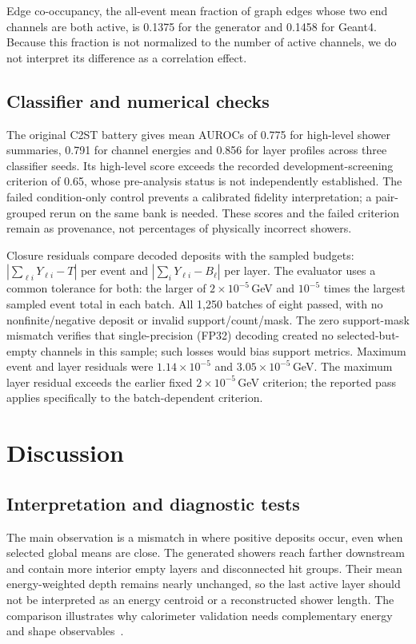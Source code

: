 \documentclass[10pt]{article}
\begin{document}
Edge co-occupancy, the all-event mean fraction of graph edges whose two end channels are both active, is 0.1375 for the generator and 0.1458 for Geant4. Because this fraction is not normalized to the number of active channels, we do not interpret its difference as a correlation effect.

\subsection{Classifier and numerical checks}

The original C2ST battery gives mean AUROCs of 0.775 for high-level shower summaries, 0.791 for channel energies and 0.856 for layer profiles across three classifier seeds. Its high-level score exceeds the recorded development-screening criterion of 0.65, whose pre-analysis status is not independently established. The failed condition-only control prevents a calibrated fidelity interpretation; a pair-grouped rerun on the same bank is needed. These scores and the failed criterion remain as provenance, not percentages of physically incorrect showers.

Closure residuals compare decoded deposits with the sampled budgets: $|\sum_{\ell i}Y_{\ell i}-T|$ per event and $|\sum_iY_{\ell i}-B_\ell|$ per layer. The evaluator uses a common tolerance for both: the larger of $2\times10^{-5}$\,GeV and $10^{-5}$ times the largest sampled event total in each batch. All 1,250 batches of eight passed, with no nonfinite/negative deposit or invalid support/count/mask. The zero support-mask mismatch verifies that single-precision (FP32) decoding created no selected-but-empty channels in this sample; such losses would bias support metrics. Maximum event and layer residuals were $1.14\times10^{-5}$ and $3.05\times10^{-5}$\,GeV. The maximum layer residual exceeds the earlier fixed $2\times10^{-5}$\,GeV criterion; the reported pass applies specifically to the batch-dependent criterion.

\FloatBarrier
\section{Discussion}
\label{sec:discussion}

\subsection{Interpretation and diagnostic tests}

The main observation is a mismatch in where positive deposits occur, even when selected global means are close. The generated showers reach farther downstream and contain more interior empty layers and disconnected hit groups. Their mean energy-weighted depth remains nearly unchanged, so the last active layer should not be interpreted as an energy centroid or a reconstructed shower length. The comparison illustrates why calorimeter validation needs complementary energy and shape observables~\cite{calochallenge,kansalmetrics}.
\end{document}
